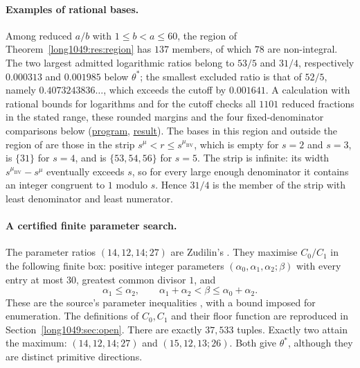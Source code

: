 \paragraph{Examples of rational bases.}
Among reduced $a/b$ with $1\le b<a\le60$, the region of
Theorem~\ref{long1049:res:region} has $137$ members, of which $78$ are
non-integral. The two largest admitted logarithmic ratios belong to
$53/5$ and $31/4$, respectively $0.000313$ and $0.001985$ below
$\theta^*$; the smallest excluded ratio is that of $52/5$, namely
$0.4073243836\ldots$, which exceeds the cutoff by $0.001641$.
A calculation with rational bounds for logarithms and for the cutoff
checks all $1101$ reduced fractions in the stated range, these rounded
margins and the four fixed-denominator comparisons below
(\href{https://github.com/wcook04/plectis-erdos/blob/4beca4ad0c00a626def9c73f2420e20ebf8d1968/research/experiments/erdos1049/rational_base_examples.py}{program}, \href{https://github.com/wcook04/plectis-erdos/blob/4beca4ad0c00a626def9c73f2420e20ebf8d1968/research/experiments/erdos1049/receipts/rational-base-examples.json}{result}). The
bases in this region and outside the region of \cite{bv1994} are those in the strip
$s^{\mu}<r\le s^{\mu_{\mathrm{BV}}}$, which is empty for $s=2$ and $s=3$, is
$\{31\}$ for $s=4$, and is $\{53,54,56\}$ for $s=5$.  The strip is infinite:
its width $s^{\mu_{\mathrm{BV}}}-s^{\mu}$ eventually exceeds $s$, so for every
large enough denominator it contains an integer congruent to $1$ modulo $s$.
Hence $31/4$ is the member of the strip with least denominator and least numerator.

\paragraph{A certified finite parameter search.}
The parameter ratios $(14,12,14;27)$ are Zudilin's \cite[p.~162]{zudilin2004}.
They maximise $C_0/C_1$ in the following finite box: positive integer
parameters $(\alpha_0,\alpha_1,\alpha_2;\beta)$ with every entry at most
$30$, greatest common divisor $1$, and
\[
 \alpha_1\le\alpha_2,\qquad
 \alpha_1+\alpha_2<\beta\le\alpha_0+\alpha_2.
\]
These are the source's parameter inequalities
\cite[Sec.~5, p.~161]{zudilin2004}, with a bound imposed for enumeration.
The definitions of $C_0,C_1$ and their floor function are reproduced in
Section~\ref{long1049:sec:open}. There are exactly $37{,}533$ tuples.
Exactly two attain the maximum: $(14,12,14;27)$ and $(15,12,13;26)$.
Both give $\theta^*$, although they are distinct primitive directions.

